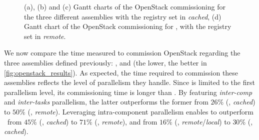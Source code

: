 \begin{figure}[t]
  \begin{center}
    \def\svgwidth{\columnwidth}
    \scriptsize
    \def\svgwidth{\columnwidth}
    \scriptsize
    \def\svgwidth{\columnwidth}
    \tiny
    \def\svgwidth{\columnwidth}
    \tiny
    \caption{(a), (b) and (c) Gantt charts of the OpenStack
      commissioning for the three different assemblies with the
      registry set in \emph{cached}, (d) Gantt chart of the OpenStack
      commissioning for \aeoass, with the registry set in
      \emph{remote}.}
  \end{center}
\end{figure}

We now compare the time measured to commission OpenStack regarding the three
assemblies defined previously: \ansass, \aeoass and \madass (the lower, the
better in \cref{fig:openstack_results}).
As expected, the time required to commission these assemblies reflects
the level of parallelism they handle. Since \ansass is limited to the
first parallelism level, its commissioning time is longer than
\aeoass. By featuring \emph{inter-comp} and \emph{inter-tasks}
parallelism, the latter outperforms the former from $26$\% (\nova,
\emph{cached}) to $50$\% (\ecotype, \emph{remote}). Leveraging
intra-component parallelism enables \madass to outperform \ansass~from
$45$\% (\nova, \emph{cached}) to $71$\% (\ecotype, \emph{remote}), and
\aeoass from $16$\% (\nova, \emph{remote}/\emph{local}) to $30$\%
(\ecotype, \emph{cached}).

